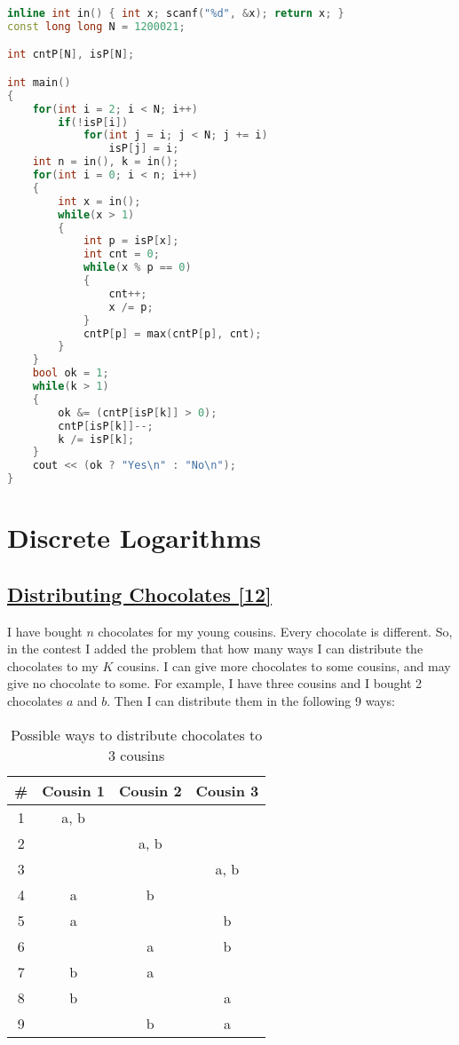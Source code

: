 \documentclass[10pt,a4paper]{article}
\begin{document}
\begin{itemize}
\begin{lstlisting}[language=C++, caption={Remainders Game}, label={1st:code}, mathescape=true, breaklines=true]
inline int in() { int x; scanf("%d", &x); return x; }
const long long N = 1200021;

int cntP[N], isP[N];

int main()
{
	for(int i = 2; i < N; i++)
		if(!isP[i])
			for(int j = i; j < N; j += i)
				isP[j] = i;
	int n = in(), k = in();
	for(int i = 0; i < n; i++)
	{
		int x = in();
		while(x > 1)
		{
			int p = isP[x];
			int cnt = 0;
			while(x % p == 0)
			{
				cnt++;
				x /= p;
			}
			cntP[p] = max(cntP[p], cnt);
		}
	}
	bool ok = 1;
	while(k > 1)
	{
		ok &= (cntP[isP[k]] > 0);
		cntP[isP[k]]--;
		k /= isP[k];
	}
	cout << (ok ? "Yes\n" : "No\n");
}
\end{lstlisting}

\section{Discrete Logarithms}
\subsection*{\href{https://lightoj.com/problem/distributing-chocolates}{\underline{Distributing Chocolates [12]}}}

I have bought $n$ chocolates for my young cousins. Every chocolate is different. So, in the contest I added the problem that how many ways I can distribute the chocolates to my $K$ cousins. I can give more chocolates to some cousins, and may give no chocolate to some. For example, I have three cousins and I bought 2 chocolates $a$ and $b$. Then I can distribute them in the following 9 ways:


\begin{table}[h!]
\centering
\begin{tabular}{|c|c|c|c|}
\hline
\# & Cousin 1 & Cousin 2 & Cousin 3 \\
\hline
1 & a, b &  &  \\
2 &  & a, b &  \\
3 &  &  & a, b \\
4 & a & b &  \\
5 & a &  & b \\
6 &  & a & b \\
7 & b & a &  \\
8 & b &  & a \\
9 &  & b & a \\
\hline
\end{tabular}
\caption{Possible ways to distribute chocolates to 3 cousins}
\end{table}




\end{itemize}
\end{document}
